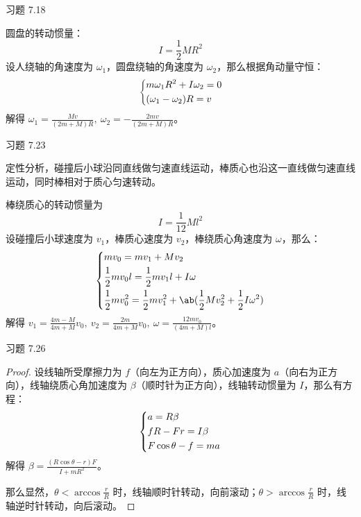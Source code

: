 \begin{problem}
    习题 7.18
    \begin{solution}
        圆盘的转动惯量：
        $$
        I = \frac{1}{2} M R^2
        $$
        设人绕轴的角速度为 $\omega_1$，圆盘绕轴的角速度为 $\omega_2$，那么根据角动量守恒：
        $$
        \begin{dcases}
            m \omega_1 R^2 + I \omega_2 = 0 \\
            (\omega_1 - \omega_2) R = v
        \end{dcases}
        $$
        解得 $\omega_1 = \frac{M v}{(2m + M) R},\ \omega_2 = - \frac{2 m v}{(2m + M) R}$。
    \end{solution}
\end{problem}

\begin{problem}
    习题 7.23
    \begin{solution}
        定性分析，碰撞后小球沿同直线做匀速直线运动，棒质心也沿这一直线做匀速直线运动，同时棒相对于质心匀速转动。

        棒绕质心的转动惯量为
        $$
        I = \frac{1}{12} M l^2
        $$
        设碰撞后小球速度为 $v_1$，棒质心速度为 $v_2$，棒绕质心角速度为 $\omega$，那么：
        $$
        \begin{dcases}
            m v_0 = m v_1 + M v_2 \\
            \frac{1}{2} m v_0 l = \frac{1}{2} m v_1 l + I \omega \\
            \frac{1}{2} m v_0^2 = \frac{1}{2} m v_1^2 + \ab(\frac{1}{2} M v_2^2 + \frac{1}{2} I \omega^2)
        \end{dcases}
        $$
        解得 $v_1 = \frac{4m - M}{4m + M} v_0,\ v_2 = \frac{2m}{4m + M} v_0,\ \omega = \frac{12m v_0}{(4m + M) l}$。
    \end{solution}
\end{problem}

\begin{problem}
    习题 7.26
    \begin{proof}
        设线轴所受摩擦力为 $f$（向左为正方向），质心加速度为 $a$（向右为正方向），线轴绕质心角加速度为 $\beta$（顺时针为正方向），线轴转动惯量为 $I$，那么有方程：
        $$
        \begin{dcases}
            a = R \beta \\
            f R - F r = I \beta \\
            F \cos \theta - f = m a \\
        \end{dcases}
        $$
        解得 $\beta = \frac{(R \cos \theta - r) F}{I + m R^2}$。
        
        那么显然，$\theta < \arccos \frac{r}{R}$ 时，线轴顺时针转动，向前滚动；$\theta > \arccos \frac{r}{R}$ 时，线轴逆时针转动，向后滚动。
    \end{proof}
\end{problem}